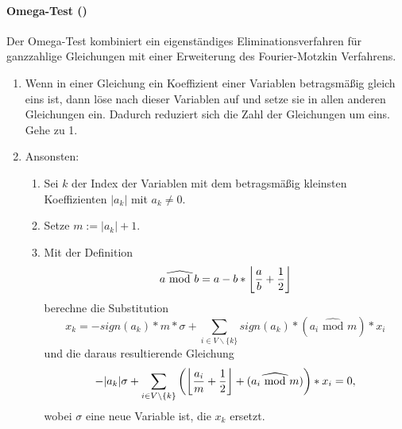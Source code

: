 \paragraph{Omega-Test (\cite{Pugh95a})}

\def\MOD{\widehat{\textrm{\ mod\ }}}
Der Omega-Test kombiniert ein eigenständiges Eliminationsverfahren für
ganzzahlige Gleichungen mit einer Erweiterung des Fourier-Motzkin
Verfahrens.

\begin{enumerate}
\item Wenn in einer Gleichung ein Koeffizient einer Variablen
  betragsmäßig gleich eins ist, dann löse nach dieser Variablen auf
  und setze sie in allen anderen Gleichungen ein. Dadurch reduziert
  sich die Zahl der Gleichungen um eins. Gehe zu 1.
\item Ansonsten:
  \begin{enumerate}
  \item Sei $k$ der Index der Variablen mit dem betragsmäßig kleinsten
    Koeffizienten $|a_k|$ mit $a_k\not=0$.
  \item Setze $m:= |a_k|+1$.
  \item Mit der Definition $$a\MOD b = a - b *
    \left\lfloor {a\over b} + {1 \over 2}\right \rfloor$$
    berechne die Substitution $$x_k = -sign(a_k)*m*\sigma +
    \sum_{i\in V\backslash\{k\}} sign(a_k)*(a_i \MOD m) * x_i$$
    und die daraus resultierende Gleichung
    $$-|a_k|\sigma + \sum_{i\in V\backslash\{k\}}\left(\left\lfloor{a_i\over
        m} + {1\over 2}\right\rfloor + (a_i\MOD m)\right) * x_i = 0,$$
    wobei $\sigma$ eine neue Variable ist, die $x_k$ ersetzt.


\end{enumerate}
\end{enumerate}

